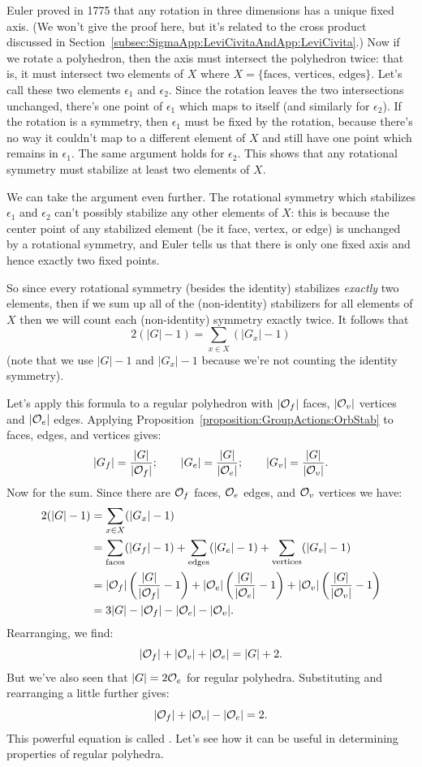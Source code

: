 Euler proved in 1775 that any rotation in three dimensions has a unique fixed axis. (We won't give the proof here, but it's related to the cross product discussed in Section~\ref{subsec:SigmaApp:LeviCivitaAndApp:LeviCivita}.)  Now if we  rotate a polyhedron, then the axis must intersect the polyhedron twice: that is, it must intersect two elements of $X$ where $X = \{\text{faces, vertices, edges}\}$. Let's call these two elements $\epsilon_1$ and $\epsilon_2$. Since the rotation leaves the two intersections unchanged, there's one point of $\epsilon_1$ which maps to itself (and similarly for $\epsilon_2$). If the rotation is a symmetry, then $\epsilon_1$ must be fixed by the rotation, because there's no way it couldn't map to a different element of $X$ and still have one point which remains in $\epsilon_1$. The same argument holds for $\epsilon_2$. This shows that any rotational symmetry must stabilize at least two elements of $X$. 

We can take the argument even further. The rotational symmetry which stabilizes $\epsilon_1$ and $\epsilon_2$ can't possibly stabilize any other elements of $X$: this is because the center point of any stabilized element (be it face, vertex, or edge) is unchanged by a rotational symmetry, and Euler tells us that there is only one fixed axis and hence exactly two fixed points.  

So since every rotational symmetry (besides the identity) stabilizes \emph{exactly} two elements, then if we sum up all of the (non-identity) stabilizers for all elements of $X$ then we will count each (non-identity) symmetry exactly twice. It follows that
\[ 2(|G|-1) = \sum_{x \in X}  (|G_x|-1) \]
(note that we use $|G|-1$ and $|G_x|-1$  because we're not counting the identity symmetry). 


Let's apply this formula to a regular polyhedron with $|{\cal O}_f|$ faces, $|{\cal O}_v|$ vertices and $|{\cal O}_e|$ edges.  Applying Proposition~\ref{proposition:GroupActions:OrbStab} to faces, edges, and vertices gives:
\[ |G_f|=\frac{|G|}{|{\cal O}_f|}; \qquad |G_e|=\frac{|G|}{|{\cal O}_e|}; \qquad |G_v|=\frac{|G|}{|{\cal O}_v|}.\]
Now for the sum.  Since there are ${\cal O}_f$ faces, ${\cal O}_e$ edges, and ${\cal O}_v$ vertices we have:
\begin{align*}
2 (|G| -1) &=  \sum_{x \in X}  (|G_x|-1)\\
&=  \sum_{\text{faces}}  (|G_f|-1)+\sum_{\text{edges}}  (|G_e|-1)+\sum_{\text{vertices}}  (|G_v|-1)\\
&= |{\cal O}_f|  \left(\frac{|G|}{|{\cal O}_f|}-1\right)+ |{\cal O}_e| \left(\frac{|G|}{|{\cal O}_e|}-1\right)+  |{\cal O}_v|\left(\frac{|G|}{|{\cal O}_v|}-1\right)\\
&=  3|G| - |{\cal O}_f| -  |{\cal O}_e| -  |{\cal O}_v|.
\end{align*}
Rearranging, we find:
\[ |{\cal O}_f| +  |{\cal O}_v|  +  |{\cal O}_e| =  |G|+2. \]
But we've also seen that $|G| = 2{\cal O}_e$ for regular polyhedra. Substituting and rearranging a little further gives:
\[ |{\cal O}_f|+|{\cal O}_v|-|{\cal O}_e|=2. \]
This powerful equation is called .  Let's see how it can be useful in determining properties of regular polyhedra.

